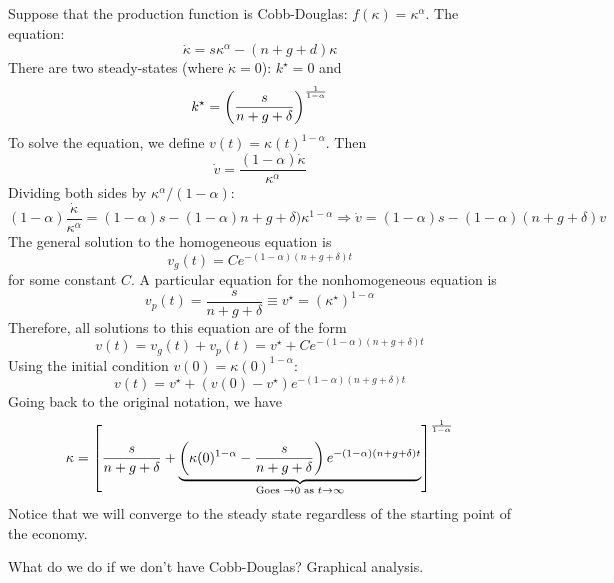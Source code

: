 \documentclass[10pt]{article}
\begin{document}
\begin{example}
	Suppose that the production function is Cobb-Douglas: $f(\kappa) = \kappa^\alpha$. The equation:
	\[
	\dot{\kappa} = s \kappa^\alpha - (n + g + d) \kappa
	\]
	There are two steady-states (where $\dot{\kappa} = 0$): $k^\star = 0$ and
	\[
	k^\star = \left( \frac{s}{n + g + \delta} \right)^{\frac{1}{1-\alpha}}
	\]
	To solve the equation, we define $v(t) = \kappa(t)^{1-\alpha}$. Then
	\[
	\dot{v} = \frac{(1-\alpha)\dot{\kappa}}{\kappa^\alpha}
	\]
	Dividing both sides by $\kappa^\alpha / (1-\alpha)$:
	\[
	(1-\alpha) \frac{\dot{\kappa}}{\kappa^\alpha} = (1-\alpha)s - (1-\alpha) n + g + \delta) \kappa^{1-\alpha} \Longrightarrow \dot{v} = (1-\alpha)s - (1-\alpha) (n + g + \delta)v
	\]
	The general solution to the homogeneous equation is
	\[
	v_g(t) = Ce^{-(1-\alpha)(n + g + \delta)t}
	\]
	for some constant $C$. A particular equation for the nonhomogeneous equation is
	\[
	v_p(t) = \frac{s}{n + g + \delta} \equiv v^\star = (\kappa^\star)^{1-\alpha}
	\]
	Therefore, all solutions to this equation are of the form
	\[
	v(t) = v_g(t) + v_p(t) = v^\star + Ce^{-(1-\alpha)(n + g + \delta)t}
	\]
	Using the initial condition $v(0) = \kappa(0)^{1-\alpha}$:
	\[
	v(t) = v^\star + (v(0) - v^\star) e^{-(1-\alpha)(n + g + \delta)t}
	\]
	Going back to the original notation, we have
	\[
	\kappa = \left[ \frac{s}{n + g + \delta} + \underbrace{\left( \kappa(0)^{1-\alpha} - \frac{s}{n + g + \delta} \right) e^{-(1-\alpha)(n + g + \delta)t}}_{\text{Goes } \to 0 \text{ as } t \to \infty} \right]^{\frac{1}{1 - \alpha}}
	\]
	Notice that we will converge to the steady state regardless of the starting point of the economy. 
\end{example}
\begin{question}
	What do we do if we don't have Cobb-Douglas? Graphical analysis.
\end{question}
\end{document}
